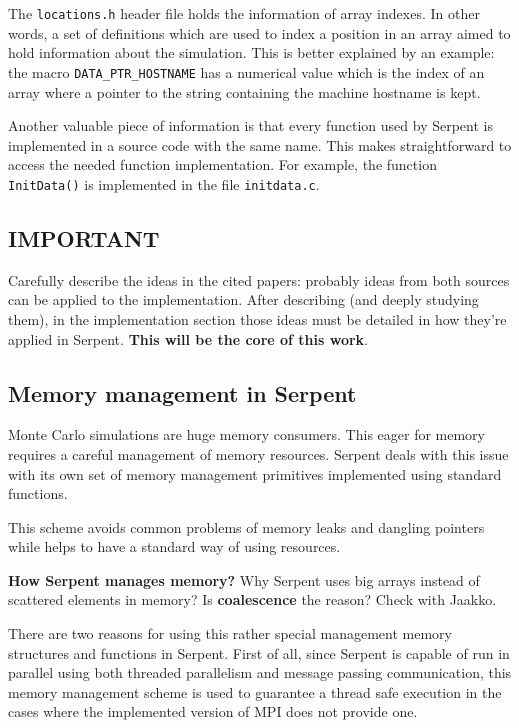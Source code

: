 \documentclass[twoside,a4paper,12pt,english,draft]{anstrans}
\begin{document}
The \texttt{locations.h} header file holds the information of array indexes. In other words, a set of
definitions which are used to index a position in an array aimed to hold information about the simulation.
This is better explained by an example: the macro \texttt{DATA\_PTR\_HOSTNAME} has a numerical value
which is the index of an array where a pointer to the string containing the machine hostname is kept.

Another valuable piece of information is that every function used by Serpent
is implemented in a source code with the same name. This makes straightforward to access the needed
function implementation. For example, the function \texttt{InitData()} is implemented in the file
\texttt{initdata.c}.

\subsection{IMPORTANT}
Carefully describe the ideas in the cited papers: probably ideas from both sources can be applied to
the implementation. After describing (and deeply studying them), in the implementation section those
ideas must be detailed in how they're applied in Serpent. \textbf{This will be the core of this work}.

\subsection{Memory management in Serpent}

Monte Carlo simulations are huge memory consumers. This eager for memory requires a careful
management of memory resources. Serpent deals with this issue with its own set of memory
management primitives implemented using standard functions.

This scheme avoids common problems of memory leaks and dangling pointers while helps to
have a standard way of using resources.

\textbf{How Serpent manages memory?}
Why Serpent uses big arrays instead of scattered elements in memory?
Is \textbf{coalescence} the reason? Check with Jaakko.

There are two reasons for using this rather special management memory
structures and functions in Serpent. First of all, since Serpent is
capable of run in parallel using both threaded parallelism and
message passing communication, this memory management scheme is
used to guarantee a thread safe execution in the cases where
the implemented version of MPI does not provide one.
\end{document}
